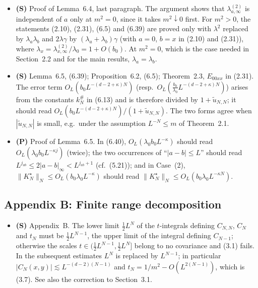 \documentclass[11pt]{amsart}
\numberwithin{equation}{section}
\newcommand{\obs}{\star}
\newcommand{\Kobs}{K^\obs}
\newcommand{\OL}{O_L}
\newcommand{\tu}{\tilde u_{N,N}}
\begin{document}
\begin{itemize}
\item \textbf{(S)} Proof of Lemma~6.4, last paragraph. The argument shows that
  $\lambda^{(2)}_{a,\infty}$ is independent of $a$ only at $m^2=0$, since it takes
  $m^2\downarrow0$ first. For $m^2>0$, the statements (2.10), (2.31), (6.5) and (6.39) are proved
  only with $\lambda^2$ replaced by $\lambda_a\lambda_b$ and $2\lambda\gamma$ by
  $(\lambda_a+\lambda_b)\gamma$ (with $a=0$, $b=x$ in (2.10) and (2.31)), where $\lambda_x=\lambda^{(2)}_{x,\infty}/\lambda_0=1+O(b_0)$. At $m^2=0$,
  which is the case needed in Section~2.2 and for the main results, $\lambda_a=\lambda_b$.

\item \textbf{(S)} Lemma~6.5, (6.39); Proposition~6.2, (6.5); Theorem~2.3, $E_{00xx}$ in (2.31).
  The error term $\OL(b_0L^{-(d-2+\kappa)N})$ (resp.\ $\OL(\frac{b_0}{\lambda_0}L^{-(d-2+\kappa)N})$)
  arises from the constants $k_N^{\#}$ in (6.13) and is therefore divided by $1+\tu$; it should
  read $\OL(b_0L^{-(d-2+\kappa)N})/(1+\tu)$. The two forms agree when $|\tu|$ is small, e.g.\ under
  the assumption $L^{-N}\le m$ of Theorem~2.1.
\item \textbf{(P)} Proof of Lemma~6.5. In (6.40), $\OL(\lambda_0b_0L^{-\kappa})$ should read
  $\OL(\lambda_0b_0L^{-\kappa j})$ (twice); the two occurrences of ``$|a-b|\le L$'' should read
  $L^{j_{ab}}\le2|a-b|_\infty<L^{j_{ab}+1}$ (cf.\ (5.21)); and in Case~(2),
  $\|\Kobs_N\|_N\le\OL(b_0\lambda_0L^{-\kappa})$ should read $\|\Kobs_N\|_N\le\OL(b_0\lambda_0L^{-\kappa N})$.

\end{itemize}

\subsection*{Appendix B: Finite range decomposition}

\begin{itemize}
\item \textbf{(S)} Appendix~B. The lower limit $\frac12L^N$ of the $t$-integrals defining
  $C_{N,N}$, $C_N$ and $t_N$ must be $\frac12L^{N-1}$, the upper limit of the integral defining
  $C_{N-1}$; otherwise the scales $t\in(\frac12L^{N-1},\frac12L^N]$ belong to no covariance and
  (3.1) fails. In the subsequent estimates $L^N$ is replaced by $L^{N-1}$; in particular
  $|C_N(x,y)|\lesssim L^{-(d-2)(N-1)}$ and $t_N=1/m^2-O(L^{2(N-1)})$, which is (3.7). See also the
  correction to Section~3.1.
\end{itemize}



\end{document}
